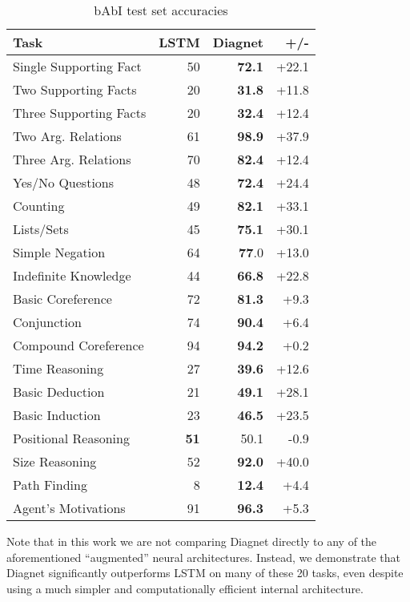 \documentclass{article}
\begin{document}
\begin{table}[h]

\centering
\caption{bAbI test set accuracies}
\begin{tabular}{|l|r|r|r|}
\hline
Task & LSTM & Diagnet & +/- \\
\hline
Single Supporting Fact & 50 & \textbf{72.1} & +22.1 \\
Two Supporting Facts & 20 & \textbf{31.8} & +11.8 \\
Three Supporting Facts & 20 & \textbf{32.4} & +12.4 \\
Two Arg. Relations & 61 & \textbf{98.9} & +37.9 \\
Three Arg. Relations & 70 & \textbf{82.4} & +12.4 \\
Yes/No Questions & 48 & \textbf{72.4} & +24.4 \\
Counting & 49 & \textbf{82.1} & +33.1 \\
Lists/Sets & 45 & \textbf{75.1} & +30.1 \\
Simple Negation & 64 & \textbf{77}.0 & +13.0 \\
Indefinite Knowledge & 44 & \textbf{66.8} & +22.8 \\
Basic Coreference & 72 & \textbf{81.3} & +9.3 \\
Conjunction & 74 & \textbf{90.4} & +6.4 \\
Compound Coreference & 94 & \textbf{94.2} & +0.2 \\
Time Reasoning & 27 & \textbf{39.6} & +12.6 \\
Basic Deduction & 21 & \textbf{49.1} & +28.1 \\
Basic Induction & 23 & \textbf{46.5} & +23.5 \\
Positional Reasoning & \textbf{51} & 50.1 & -0.9 \\
Size Reasoning & 52 & \textbf{92.0} & +40.0 \\
Path Finding & 8 & \textbf{12.4} & +4.4 \\
Agent's Motivations & 91 & \textbf{96.3} & +5.3 \\
\hline

\end{tabular}

\end{table}

Note that in this work we are not comparing Diagnet directly to any of the aforementioned “augmented” neural architectures. Instead, we demonstrate that Diagnet significantly outperforms LSTM on many of these 20 tasks, even despite using a much simpler and computationally efficient internal architecture.
\end{document}
